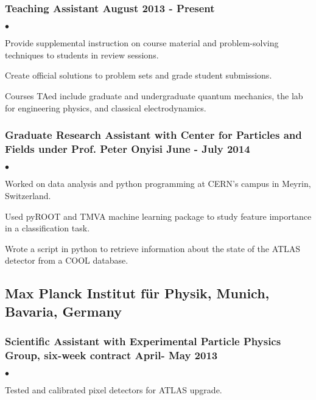 \documentclass[letterpaper]{article}
\renewenvironment{itemize}{
  \begin{list}{$\bullet$}{
    \setlength{\itemsep}{0em}
    \setlength{\parskip}{0em}
    \setlength{\parsep}{0em} 
    \setlength{\topsep}{0em} 
  }
}{
  \end{list}
}
\begin{document}
\subsubsection*{Teaching Assistant \hfill August 2013 - Present}
    \begin{itemize}
    
        \item Provide supplemental instruction on course material and problem-solving techniques to students in review sessions.
        \item Create official solutions to problem sets and grade student submissions.
        \item Courses TAed include graduate and undergraduate quantum mechanics, the lab for engineering physics, and classical electrodynamics.
        
    \end{itemize}
    
\subsubsection*{Graduate Research Assistant with Center for Particles and Fields under Prof. Peter Onyisi \hfill June - July 2014}
    \begin{itemize}
    
    	\item Worked on data analysis and python programming at CERN's campus in Meyrin, Switzerland.
        \item Used pyROOT and TMVA machine learning package to study feature importance in a classification task.
        \item Wrote a script in python to retrieve information about the state of the ATLAS detector from a COOL database.
        
    \end{itemize}
    
\subsection*{Max Planck Institut f\"ur Physik, Munich, Bavaria, Germany}

\subsubsection*{Scientific Assistant with Experimental Particle Physics Group, six-week contract \hfill April- May 2013}
    \begin{itemize}
        \item Tested and calibrated pixel detectors for ATLAS upgrade. 
    \end{itemize}
\end{document}
